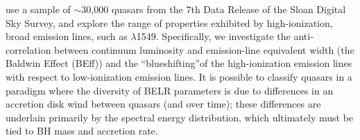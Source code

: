 \documentclass[a4paper,fleqn,usenatbib]{mnras}
\begin{document}
\citet{Dietrich2002}

\citet{Croom2002} 

\citet{Hamann2002} 





\citet{Richards2011} 
use a sample of $\sim$30,000 quasars from the 7th Data Release of the Sloan Digital Sky Survey, and explore the range of properties exhibited by high-ionization, broad emission lines, such as \civ $\lambda$1549. Specifically, we investigate the anti-correlation between continuum luminosity and emission-line equivalent width (the Baldwin Effect (BEff)) and the ``blueshifting''of the high-ionization emission lines with respect to low-ionization emission lines. 
It is possible to classify quasars in a paradigm where the diversity of BELR parameters is due to differences in an accretion disk wind between quasars (and over time); these differences are underlain primarily by the spectral energy distribution, which ultimately must be tied to BH mass and accretion rate.
\end{document}
